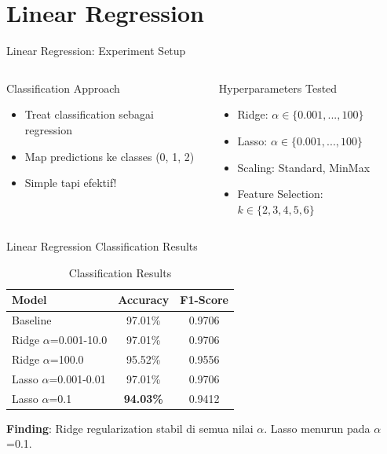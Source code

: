 \documentclass[aspectratio=169]{beamer}
\newcommand{\hlg}[1]{\textcolor{AWSGreen}{\textbf{#1}}}
\newcommand{\hlr}[1]{\textcolor{AWSRed}{\textbf{#1}}}
\begin{document}
\section{Linear Regression}

\begin{frame}{Linear Regression: Experiment Setup}
\fontsize{10}{11}\selectfont

\begin{columns}
\begin{block}{Classification Approach}
\begin{itemize}
    \item Treat classification sebagai regression
    \item Map predictions ke classes (0, 1, 2)
    \item Simple tapi efektif!
\end{itemize}
\end{block}

\begin{block}{Hyperparameters Tested}
\begin{itemize}
    \item Ridge: $\alpha \in \{0.001, ..., 100\}$
    \item Lasso: $\alpha \in \{0.001, ..., 100\}$
    \item Scaling: Standard, MinMax
    \item Feature Selection: $k \in \{2,3,4,5,6\}$
\end{itemize}
\end{block}
\end{columns}
\end{frame}

\begin{frame}{Linear Regression Classification Results}
\fontsize{10}{11}\selectfont

\begin{table}[htbp]
\centering
\caption{Classification Results}
\begin{tabular}{lcc}
\toprule
Model & Accuracy & F1-Score \\
\midrule
Baseline & 97.01\% & 0.9706 \\
Ridge $\alpha$=0.001-10.0 & 97.01\% & 0.9706 \\
Ridge $\alpha$=100.0 & 95.52\% & 0.9556 \\
Lasso $\alpha$=0.001-0.01 & 97.01\% & 0.9706 \\
Lasso $\alpha$=0.1 & \hlr{94.03\%} & 0.9412 \\
\bottomrule
\end{tabular}
\end{table}

\vspace{0.1in}
\hlg{Finding}: Ridge regularization stabil di semua nilai $\alpha$. Lasso menurun pada $\alpha$=0.1.
\end{frame}
\end{document}
